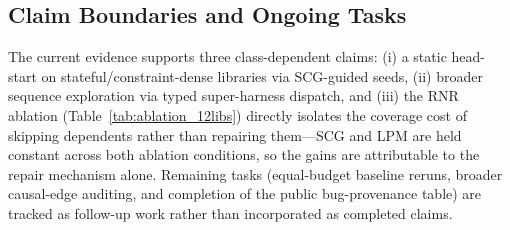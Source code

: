 \subsection{Claim Boundaries and Ongoing Tasks}
\label{sec:eval_remaining}

The current evidence supports three class-dependent claims: (i) a static head-start on stateful/constraint-dense libraries via SCG-guided seeds, (ii) broader sequence exploration via typed super-harness dispatch, and (iii) the RNR ablation (Table~\ref{tab:ablation_12libs}) directly isolates the coverage cost of skipping dependents rather than repairing them---SCG and LPM are held constant across both ablation conditions, so the gains are attributable to the repair mechanism alone. Remaining tasks (equal-budget baseline reruns, broader causal-edge auditing, and completion of the public bug-provenance table) are tracked as follow-up work rather than incorporated as completed claims.
